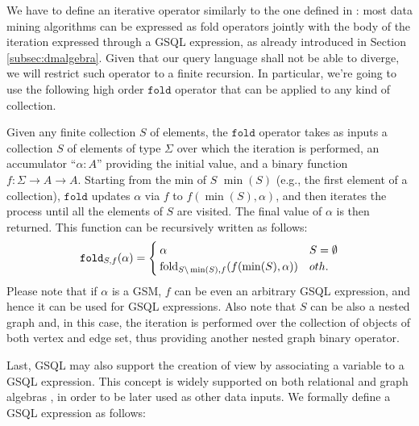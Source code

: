  We have to define an iterative operator similarly to the  one defined in \cite{Calders2006,apacheflink}:  most data mining algorithms can be expressed as fold operators jointly with the body of the iteration expressed through a GSQL expression, as already introduced in Section \vref{subsec:dmalgebra}. Given that our query language shall not be able to diverge, we will restrict such operator to a finite recursion. In particular, we're going to use the following  high order $\texttt{fold}$ operator that can be applied to any kind of collection.

\begin{definition}\label{def:fold}
	Given any finite collection $S$ of elements, the $\texttt{fold}$ operator takes as inputs a collection $S$ of elements of type $\Sigma$ over which the iteration is performed, an accumulator ``$\alpha \colon A$'' providing the initial value, and a binary function $f:\Sigma\to A\to A$. Starting from the min of $S$ $\min(S)$ (e.g., the first element of a collection), $\texttt{fold}$ updates $\alpha$ via $f$  to $f(\min(S),\alpha)$, and then iterates the process until all the elements of $S$ are visited. The final value of $\alpha$ is then returned.
	This function can be recursively written as follows:
	\[\texttt{fold}_{S,f}(\alpha)=\begin{cases}
	\alpha & S=\emptyset\\
	\textup{fold}_{S\backslash\min(S),f}(f(\min(S),\alpha)) & oth.
	\end{cases}\]
	Please note that if $\alpha$ is a GSM, $f$ can be even an arbitrary GSQL expression, and hence it can be used for GSQL expressions. Also note that $S$ can be also a nested graph and, in this case, the iteration is performed over the collection of objects of both vertex and edge set, thus providing another nested graph binary operator.
\end{definition}

 Last, GSQL may also support the creation of view by associating  a variable to a GSQL expression. This concept is widely supported on both relational \cite{Calders2006,atzeniEN,atzeniIT} and graph algebras \cite{GRAD}, in order to be later used as other data inputs. We  formally define a GSQL expression as follows:

